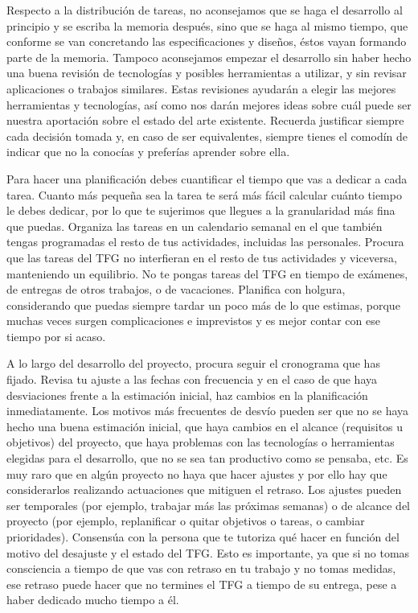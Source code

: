 Respecto a la distribución de tareas, no aconsejamos que se haga el desarrollo al principio y se escriba la memoria después, sino que se haga al mismo tiempo, que conforme se van concretando las especificaciones y diseños, éstos vayan formando parte de la memoria. Tampoco aconsejamos empezar el desarrollo sin haber hecho una buena revisión de tecnologías y posibles herramientas a utilizar, y sin revisar aplicaciones o trabajos similares. Estas revisiones ayudarán a elegir las mejores herramientas y tecnologías, así como nos darán mejores ideas sobre cuál puede ser nuestra aportación sobre el estado del arte existente. Recuerda justificar siempre cada decisión tomada y, en caso de ser equivalentes, siempre tienes el comodín de indicar que no la conocías y preferías aprender sobre ella.

Para hacer una planificación debes cuantificar el tiempo que vas a dedicar a cada tarea. Cuanto más pequeña sea la tarea te será más fácil calcular cuánto tiempo le debes dedicar, por lo que te sujerimos que llegues a la granularidad más fina que puedas. Organiza las tareas en un calendario semanal en el que también tengas programadas el resto de tus actividades, incluidas las personales. Procura que las tareas del TFG no interfieran en el resto de tus actividades y viceversa, manteniendo un equilibrio. No te pongas tareas del TFG en tiempo de exámenes, de entregas de otros trabajos, o de vacaciones. Planifica con holgura, considerando que puedas siempre tardar un poco más de lo que estimas, porque muchas veces surgen complicaciones e imprevistos y es mejor contar con ese tiempo por si acaso.

A lo largo del desarrollo del proyecto, procura seguir el cronograma que has fijado. Revisa tu ajuste a las fechas con frecuencia y en el caso de que haya desviaciones frente a la estimación inicial, haz cambios en la planificación inmediatamente. Los motivos más frecuentes de desvío pueden ser que no se haya hecho una buena estimación inicial, que haya cambios en el alcance (requisitos u objetivos) del proyecto, que haya problemas con las tecnologías o herramientas elegidas para el desarrollo, que no se sea tan productivo como se pensaba, etc. Es muy raro que en algún proyecto no haya que hacer ajustes y por ello hay que considerarlos realizando actuaciones que mitiguen el retraso. Los ajustes pueden ser temporales (por ejemplo, trabajar más las próximas semanas) o de alcance del proyecto (por ejemplo, replanificar o quitar objetivos o tareas, o cambiar prioridades). Consensúa con la persona que te tutoriza qué hacer en función del motivo del desajuste y el estado del TFG. Esto es importante, ya que si no tomas consciencia a tiempo de que vas con retraso en tu trabajo y no tomas medidas, ese retraso puede hacer que no termines el TFG a tiempo de su entrega, pese a haber dedicado mucho tiempo a él. 

